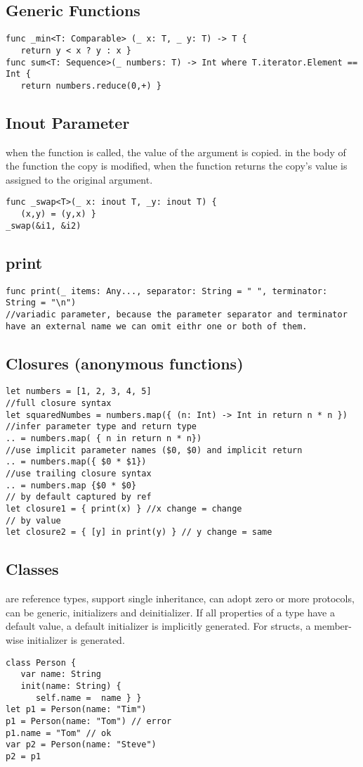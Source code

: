\subsection{Generic Functions}
\begin{lstlisting}
func _min<T: Comparable> (_ x: T, _ y: T) -> T {
   return y < x ? y : x }
func sum<T: Sequence>(_ numbers: T) -> Int where T.iterator.Element == Int {
   return numbers.reduce(0,+) }
\end{lstlisting}

\subsection{Inout Parameter}
when the function is called, the value of the argument is copied. in the body of the function the copy is modified, when the function returns the copy's value is assigned to the original argument.
\begin{lstlisting}
func _swap<T>(_ x: inout T, _y: inout T) {
   (x,y) = (y,x) }
_swap(&i1, &i2)
\end{lstlisting}

\subsection{print}
\begin{lstlisting}
func print(_ items: Any..., separator: String = " ", terminator: String = "\n")
//variadic parameter, because the parameter separator and terminator have an external name we can omit eithr one or both of them.
\end{lstlisting}

\subsection{Closures (anonymous functions)}
\begin{lstlisting}
let numbers = [1, 2, 3, 4, 5]
//full closure syntax
let squaredNumbes = numbers.map({ (n: Int) -> Int in return n * n })
//infer parameter type and return type
.. = numbers.map( { n in return n * n})
//use implicit parameter names ($0, $0) and implicit return
.. = numbers.map({ $0 * $1})
//use trailing closure syntax
.. = numbers.map {$0 * $0}
// by default captured by ref
let closure1 = { print(x) } //x change = change
// by value
let closure2 = { [y] in print(y) } // y change = same
\end{lstlisting}

\subsection{Classes}
are reference types, support single inheritance, can adopt zero or more protocols, can be generic, initializers and deinitializer. If all properties of a type have a default value, a default initializer is implicitly generated. For structs, a member-wise initializer is generated.
\begin{lstlisting}
class Person {
   var name: String
   init(name: String) {
      self.name =  name } }
let p1 = Person(name: "Tim")
p1 = Person(name: "Tom") // error
p1.name = "Tom" // ok
var p2 = Person(name: "Steve")
p2 = p1
\end{lstlisting}

